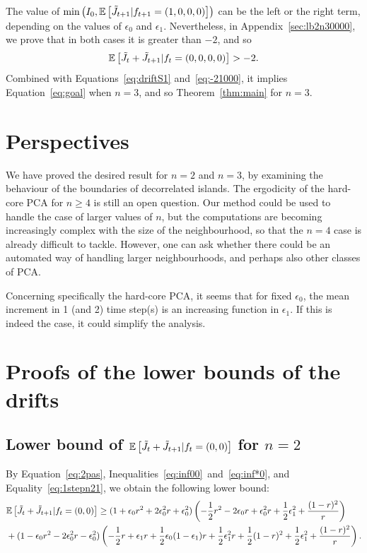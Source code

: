 \documentclass[11pt]{article}
\theoremstyle{plain}
\theoremstyle{definition}
\theoremstyle{remark}
\newcommand{\esp}[1]{\mathbb{E}\left[ #1 \right]}
\begin{document}
The value of $\min \left( I_0, \esp{\Tilde{J}_{t+1}|f_{t+1}=(1,0,0,0)} \right)$ can be the left or the right term, depending on the values of $\epsilon_0$ and $\epsilon_1$. Nevertheless, in Appendix~\ref{sec:lb2n30000}, we prove that in both cases it is greater than $-2$, and so
\begin{equation}
    \esp{\Tilde{J}_{t}+\Tilde{J}_{t+1} | f_t=(0,0,0,0)} > -2.
\end{equation}
Combined with Equations~\eqref{eq:driftS1} and~\eqref{eq:-21000}, it implies Equation~\eqref{eq:goal} when $n=3$, and so Theorem~\ref{thm:main} for $n=3$.

\section{Perspectives}
We have proved the desired result for $n=2$ and $n=3$, by examining the behaviour of the boundaries of decorrelated islands. The ergodicity of the hard-core PCA for $n\geq 4$ is still an open question. Our method could be used to handle the case of larger values of $n$, but the computations are becoming increasingly complex with the size of the neighbourhood, so that the $n=4$ case is already difficult to tackle. However, one can ask whether there could be an automated way of handling larger neighbourhoods, and perhaps also other classes of PCA.

Concerning specifically the hard-core PCA, it seems that for fixed $\epsilon_0$, the mean increment in 1 (and 2) time step(s) is an increasing function in $\epsilon_1$. If this is indeed the case, it could simplify the analysis.




\newpage

\section{Proofs of the lower bounds of the drifts} \label{sec:Appendix}
\subsection{Lower bound of $\esp{\Tilde{J}_{t} + \Tilde{J}_{t+1} | f_t = (0,0)}$ for $n=2$} \label{sec:proofn200}
By Equation~\eqref{eq:2pas}, Inequalities~\eqref{eq:inf00}~and~\eqref{eq:inf*0}, and Equality~\eqref{eq:1stepn21}, we obtain the following lower bound: 
\begin{align*}
& \esp{\Tilde{J}_{t}+\Tilde{J}_{t+1} | f_t=(0,0)} \geq  (1+\epsilon_0 r^2 + 2 \epsilon_0^2 r + \epsilon_0^2) \left(-\frac{1}{2} r^2 - 2 \epsilon_0 r + \epsilon_0^2 r + \frac{1}{2} \epsilon_1^2 + \frac{(1-r)^2}{r} \right) \nonumber\\
& + (1-\epsilon_0 r^2 - 2 \epsilon_0^2 r - \epsilon_0^2) \left( -\frac{1}{2}r + \epsilon_1 r + \frac{1}{2} \epsilon_0 (1-\epsilon_1)r + \frac{1}{2} \epsilon_1^2 r + \frac{1}{2} (1-r)^2 + \frac{1}{2}\epsilon_1^2 + \frac{(1-r)^2}{r} \right).
\end{align*}
\end{document}
